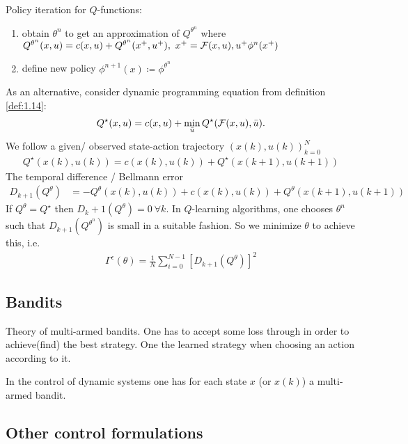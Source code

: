 Policy iteration for \(Q\)-functions:
\begin{enumerate}
    \item obtain \(\theta^n\) to get an approximation of \(Q^{\theta^n}\)
          where \(Q^{\theta^n}(x,u)=c(x,u)+Q^{\theta^n}(x^+,u^+),\ x^+=\cF(x,u),u^+\phi^n(x^+)\)
    \item define new policy \(\phi^{n+1}(x)\coloneqq \phi^{\theta^n}\) 
\end{enumerate}

As an alternative, consider dynamic programming equation from definition \ref{def:1.14}:
\begin{align*}
    Q^\star(x,u)=c(x,u)+\min_{\bar{u}}Q^\star(\mathcal{F}(x,u),\bar{u}).
\end{align*}
We follow a given/ observed state-action trajectory \((x(k),u(k))_{k=0}^N\)
\begin{align*}
    Q^\star(x(k),u(k))=c(x(k),u(k))+Q^\star(x(k+1),u(k+1))
\end{align*}
The temporal difference / Bellmann error 
\begin{align*}
    D_{k+1}(Q^\theta)&=-Q^\theta(x(k),u(k))+c(x(k),u(k))+Q^\theta(x(k+1),u(k+1))
\end{align*} 
If \(Q^\theta=Q^\star\) then \(D_k+1(Q^\theta)=0\ \forall k\). In \(Q\)-learning 
algorithms, one chooses \(\theta^n\) such that \(D_{k+1}(Q^{\theta^n})\)
is small in a suitable fashion. So we minimize \(\theta\) to achieve this, i.e. 
\begin{align*}
    \Gamma^\epsilon(\theta)=\frac{1}{N}\sum_{i=0}^{N-1}[D_{k+1}(Q^\theta)]^2
\end{align*} 

\subsection{Bandits}
Theory of multi-armed bandits. One has to accept some 
loss through  in order to achieve(find) the best strategy.
One  the learned strategy when choosing an action according to it.

In the control of dynamic systems one has for each state \(x\) (or \(x(k)\)) a 
multi-armed bandit.

\subsection{Other control formulations}

